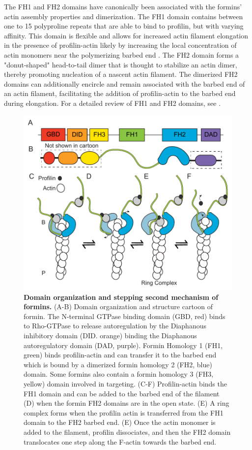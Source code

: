 The FH1 and FH2 domains have canonically been associated with the formins' actin assembly properties and dimerization. The FH1 domain contains between one to 15 polyproline repeats that are able to bind to profilin, but with varying affinity. This domain is flexible and allows for increased actin filament elongation in the presence of profilin-actin likely by increasing the local concentration of actin monomers near the polymerizing barbed end \citep{romero_formin_2004,goode_mechanism_2007}. The FH2 domain forms a "donut-shaped" head-to-tail dimer that is thought to stabilize an actin dimer, thereby promoting nucleation of a nascent actin filament. The dimerized FH2 domains can additionally encircle and remain associated with the barbed end of an actin filament, facilitating the addition of profilin-actin to the barbed end during elongation. For a detailed review of FH1 and FH2 domains, see \citep{paul_review_2009}. 

\begin{figure}
\centering
\includegraphics[width=13cm]{img/ch01/formin_mech.pdf}
\caption[Domain organization and stepping second mechanism of formins.]{\textbf{Domain organization and stepping second mechanism of formins.} (A-B) Domain organization and structure cartoon of formin. The N-terminal GTPase binding domain (GBD, red) binds to Rho-GTPase to release autoregulation by the Diaphanous inhibitory domain (DID. orange) binding the Diaphanous autoregulatory domain (DAD, purple). Formin Homology 1 (FH1, green) binds profilin-actin and can transfer it to the barbed end which is bound by a dimerized formin homology 2 (FH2, blue) domain. Some formins also contain a formin homology 3 (FH3, yellow) domain involved in targeting. (C-F) Profilin-actin binds the FH1 domain and can be added to the barbed end of the filament (D) when the formin FH2 domains are in the open state. (E) A ring complex forms when the profilin actin is transferred from the FH1 domain to the FH2 barbed end. (E) Once the actin monomer is added to the filament, profilin dissociates, and then the FH2 domain translocates one step along the F-actin towards the barbed end.} 
\label{fig:formin-domain}
\end{figure}

